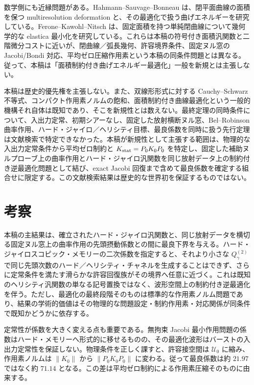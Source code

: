 数学側にも近縁問題がある。Hahmann--Sauvage--Bonneau は、閉平面曲線の面積を保つ multiresolution deformation と、その最適化で扱う曲げエネルギーを研究している\cite{Hahmann2005}。Ferone--Kawohl--Nitsch は、固定面積を持つ単純閉曲線について幾何学的な elastica 最小化を研究している\cite{Ferone2016}。これらは本稿の符号付き面積汎関数と二階微分コストに近いが、閉曲線／弧長幾何、許容境界条件、固定ヌル窓の Jacobi/Bondi 対応、平均ゼロ圧縮作用素という本稿の同条件問題とは異なる。従って、本稿は「面積制約付き曲げエネルギー最適化」一般を新規とは主張しない。

本稿は歴史的優先権を主張しない。また、双線形形式に対する Cauchy--Schwarz 不等式、コンパクト作用素ノルムの飽和、面積制約付き曲線最適化という一般的機構それ自体は既知であり、そこを新規性とは数えない。最終定理の同時条件について、入出力定常、初期シアーなし、固定した放射横断ヌル窓、Bel--Robinson 曲率作用、ハード・ジャイロ／ヘリシティ目標、最良係数を同時に扱う先行定理は文献検索で特定できなかった。本稿が新規性として主張する範囲は、物理的な入出力定常条件から平均ゼロ制約と $K_{\rm stat}=P_0K_0P_0$ を特定し、固定した補助ヌルプローブ上の曲率作用とハード・ジャイロ汎関数を同じ放射データ上の制約付き逆最適化問題として結び、exact Jacobi 回復まで含めて最良係数を確定する組合せに限定する。この文献検索結果は歴史的な世界初を保証するものではない。

\section{考察}
本稿の主結果は、確立されたハード・ジャイロ汎関数と、同じ放射データを横切る固定ヌル窓上の曲率作用の先頭摂動係数との間に最良下界を与える。ハード・ジャイロスコピック・メモリーの二次係数を指定すると、それより小さな $Q_\gamma^{(2)}$ で同じ先頭次数のハード／ヘリシティ・チャネルを生成することはできず、さらに定常条件を満たす滑らかな許容回復族がその境界へ任意に近づく。これは既知のヘリシティ汎関数の単なる記号置換ではなく、波形空間上の制約付き逆最適化を伴う。ただし、最適化の最終段階そのものは標準的な作用素ノルム問題であり、結果の学術的価値はその物理的な問題設定・制約作用素・対応関係が同条件で既知かどうかに依存する。

定常性が係数を大きく変える点も重要である。無拘束 Jacobi 最小作用問題の係数はハード・メモリーへ形式的に移せるものの、その最適化波形はバーストの入出力定常性を保証しない。物理条件を正しく課すと、許容接空間は $\mathcal U_0$ に縮み、作用素ノルムは $\|K_0\|$ から $\|P_0K_0P_0\|$ に変わる。従って最良係数は約 $21.97$ ではなく約 $71.14$ となる。この差は平均ゼロ制約による作用素圧縮そのものに由来する。

